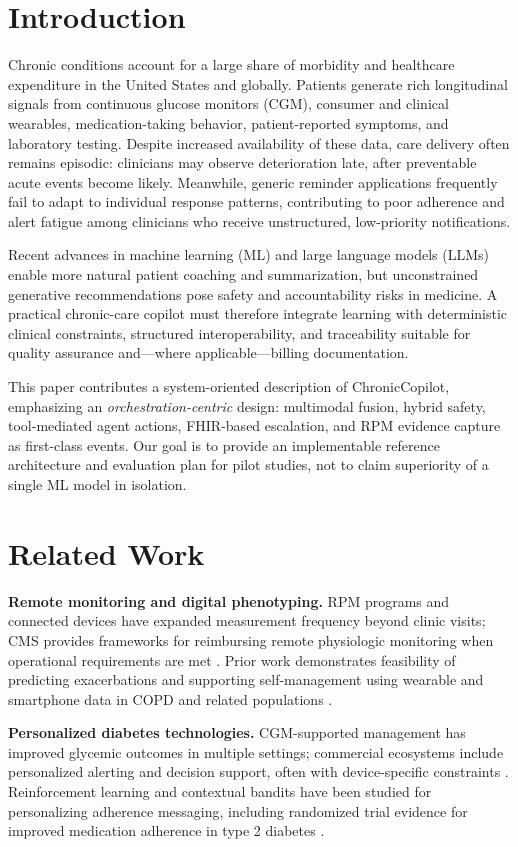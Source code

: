 \documentclass[conference]{IEEEtran}
\begin{document}
\section{Introduction}
Chronic conditions account for a large share of morbidity and healthcare expenditure in the United States and globally. Patients generate rich longitudinal signals from continuous glucose monitors (CGM), consumer and clinical wearables, medication-taking behavior, patient-reported symptoms, and laboratory testing. Despite increased availability of these data, care delivery often remains episodic: clinicians may observe deterioration late, after preventable acute events become likely. Meanwhile, generic reminder applications frequently fail to adapt to individual response patterns, contributing to poor adherence and alert fatigue among clinicians who receive unstructured, low-priority notifications.

Recent advances in machine learning (ML) and large language models (LLMs) enable more natural patient coaching and summarization, but unconstrained generative recommendations pose safety and accountability risks in medicine. A practical chronic-care copilot must therefore integrate learning with deterministic clinical constraints, structured interoperability, and traceability suitable for quality assurance and---where applicable---billing documentation.

This paper contributes a system-oriented description of ChronicCopilot, emphasizing an \emph{orchestration-centric} design: multimodal fusion, hybrid safety, tool-mediated agent actions, FHIR-based escalation, and RPM evidence capture as first-class events. Our goal is to provide an implementable reference architecture and evaluation plan for pilot studies, not to claim superiority of a single ML model in isolation.

\section{Related Work}
\textbf{Remote monitoring and digital phenotyping.} RPM programs and connected devices have expanded measurement frequency beyond clinic visits; CMS provides frameworks for reimbursing remote physiologic monitoring when operational requirements are met \cite{cmsrpm,cmsvalue}. Prior work demonstrates feasibility of predicting exacerbations and supporting self-management using wearable and smartphone data in COPD and related populations \cite{copdml}.

\textbf{Personalized diabetes technologies.} CGM-supported management has improved glycemic outcomes in multiple settings; commercial ecosystems include personalized alerting and decision support, often with device-specific constraints \cite{cgmoutcomes}. Reinforcement learning and contextual bandits have been studied for personalizing adherence messaging, including randomized trial evidence for improved medication adherence in type 2 diabetes \cite{reinforce}.
\end{document}

